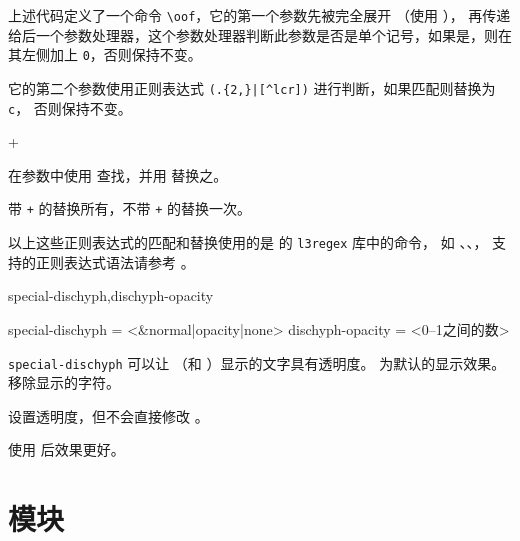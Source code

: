 \documentclass{cusdoc}
\begin{document}
上述代码定义了一个命令 \verb|\oof|，它的第一个参数先被完全展开
（使用 ），
再传递给后一个参数处理器，这个参数处理器判断此参数是否是单个记号，如果是，则在其左侧加上 
\verb|0|，否则保持不变。

它的第二个参数使用正则表达式 \verb!(.{2,}|[^lcr])! 进行判断，如果匹配则替换为 \verb|c|，
否则保持不变。

\begin{function}{\RegexReplaceArgument}
  \begin{syntax}
    \V\RegexReplaceArgument   {} 
    \V\RegexReplaceArgument +  
  \end{syntax}
在参数中使用  查找，并用  替换之。

带 \texttt{+} 的替换所有，不带 \texttt{+} 的替换一次。
\end{function}


\begin{texnote}
以上这些正则表达式的匹配和替换使用的是 \LaTeXiii 的 \texttt{l3regex} 库中的命令，
如 、、，
支持的正则表达式语法请参考 。
\end{texnote}

\begin{keyval}[path=typo]{special-dischyph,dischyph-opacity}
  \begin{syntax}
    special-dischyph = <&normal|opacity|none>
    dischyph-opacity = <{0--1之间的数}>
  \end{syntax}
\verb|special-dischyph| 可以让 \tn{-} （和 ）显示的文字具有透明度。
 为默认的显示效果。 移除显示的字符。

 设置透明度，但不会直接修改 。

使用  后效果更好。
\end{keyval}


\section{模块}
\end{document}
